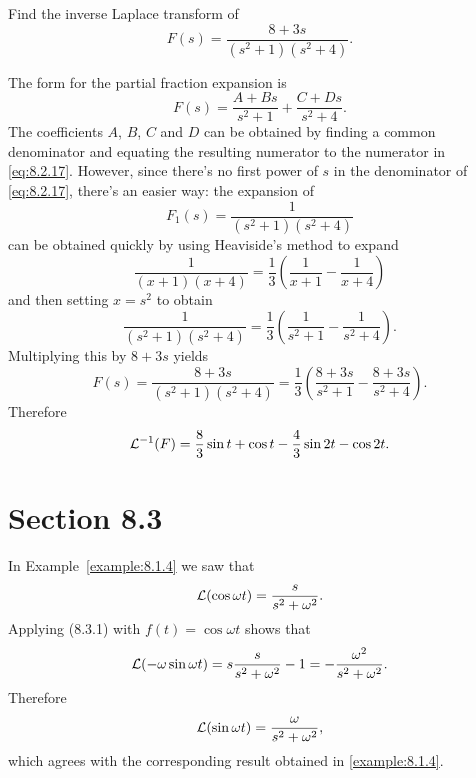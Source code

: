 \setcounter{example}{8}
\setcounter{equation}{16}
\begin{example}
  \label{example:8.2.9}\rm Find the inverse Laplace transform of
  \begin{equation}
    \label{eq:8.2.17}F(s)=\frac{8+3s}{(s^{2}+1)(s^{2}+4)}.
  \end{equation}
\end{example}
\begin{examplesolution}
\solution The form for the partial fraction expansion is
\[
  F(s)=\frac{A+Bs}{s^{2}+1}+\frac{C+Ds}{s^{2}+4}.
\]
The coefficients $A$, $B$, $C$ and $D$ can be obtained by finding a common denominator and equating
the resulting numerator to the numerator in \eqref{eq:8.2.17}. However, since there's no first power
of $s$ in the denominator of \eqref{eq:8.2.17}, there's an easier way: the expansion of
\[
  F_{1}(s)=\frac{1}{(s^{2}+1)(s^{2}+4)}
\]
can be obtained quickly by using Heaviside's method to expand
\[
  \frac{1}{(x+1)(x+4)}=\frac{1}{3}\left(\frac{1}{x+1}-\frac{1}{x+4}\right)
\]
and then setting $x=s^{2}$ to obtain
\[
  \frac{1}{(s^{2}+1)(s^{2}+4)}=\frac{1}{3}\left(\frac{1}{s^{2}+1}-\frac{1}{s^{2}+4}\right).
\]
Multiplying this by $8+3s$ yields
\[
  F(s)=\frac{8+3s}{(s^{2}+1)(s^{2}+4)}=\frac{1}{3}\left(\frac{8+3s}{s^{2}+1}-\frac{8+3s}{s^{2}+4}\right).
\]
Therefore
\[
  {\cal L}^{-1}(F)=\frac{8}{3}\sin t+\cos t-\frac{4}{3}\sin2t-\cos2t.
\]
\end{examplesolution}

\section*{Section 8.3}
\setcounter{chapter}{8}
\setcounter{section}{3}

\setcounter{example}{0}
\begin{example}
  \label{example:8.3.1}\rm In Example~\ref{example:8.1.4} we saw that
  \[
    {\cal L}(\cos\omega t)=\frac{s}{s^{2}+\omega^{2}}.
  \]
  Applying \textup{(8.3.1)} with $f(t)=\cos\omega t$ shows that
  \[
    {\cal L}(-\omega\sin\omega t)=s\frac{s}{s^{2}+\omega^{2}}-1=- \frac{\omega^{2}}{s^{2}+\omega^{2}}.
  \]
  Therefore
  \[
    {\cal L}(\sin\omega t)=\frac{\omega}{s^{2}+\omega^{2}},
  \]
  which agrees with the corresponding result obtained in \ref{example:8.1.4}. \bbox
\end{example}

